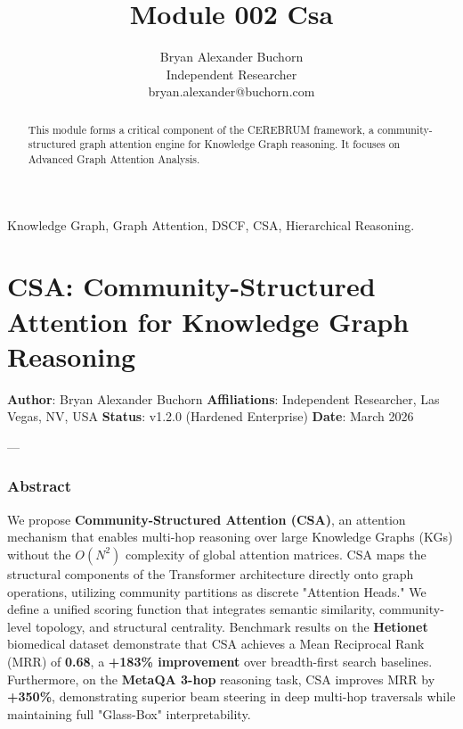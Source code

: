\documentclass[10pt,journal,compsoc]{IEEEtran}
\begin{document}
\title{Module 002 Csa}
\author{Bryan Alexander Buchorn \\ Independent Researcher \\ bryan.alexander@buchorn.com}

\maketitle

\begin{abstract}
This module forms a critical component of the CEREBRUM framework, a community-structured graph attention engine for Knowledge Graph reasoning. It focuses on Advanced Graph Attention Analysis.
\end{abstract}

\begin{IEEEkeywords}
Knowledge Graph, Graph Attention, DSCF, CSA, Hierarchical Reasoning.
\end{IEEEkeywords}

\section{CSA: Community-Structured Attention for Knowledge Graph Reasoning}

\textbf{Author}: Bryan Alexander Buchorn  
\textbf{Affili\-ations}: Independent Researcher, Las Vegas, NV, USA  
\textbf{Status}: v1.2.0 (Hardened Enterprise)  
\textbf{Date}: March 2026

---

\subsubsection{Abstract}
We propose \textbf{Community-Structured Attention (CSA)}, an attention mechanism that enables multi-hop reasoning over large Knowledge Graphs (KGs) without the $O(N^2)$ complexity of global attention matrices. CSA maps the structural components of the Transformer archi\-tecture \cite{vaswani2017attention} directly onto graph operations, utilizing community partitions as discrete "Attention Heads." We define a unified scoring function that integrates semantic similarity, community-level topology, and structural centrality. Benchmark results on the \textbf{Hetionet} \cite{hetionet2017} biomedical dataset demonstrate that CSA achieves a Mean Reciprocal Rank (MRR) of \textbf{0.68}, a \textbf{+183\% improvement} over breadth-first search baselines. Furthermore, on the \textbf{MetaQA 3-hop} \cite{metaqa2017} reasoning task, CSA improves MRR by \textbf{+350\%}, demon\-strating superior beam steering in deep multi-hop traversals while maintaining full "Glass-Box" inter\-pretability.
\end{document}
